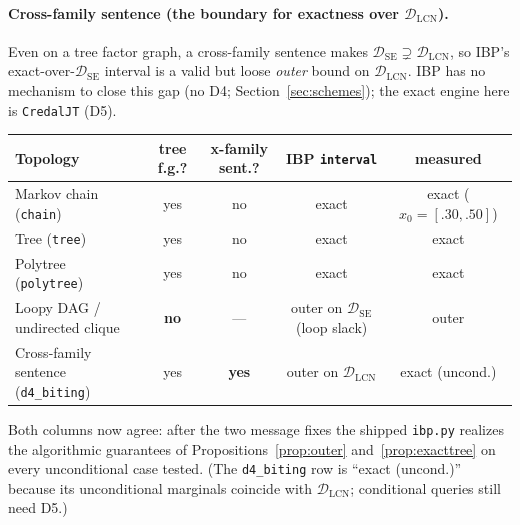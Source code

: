 \documentclass[11pt]{article}
\newcommand{\DSE}{\mathcal{D}_{\mathrm{SE}}}
\newcommand{\DLCN}{\mathcal{D}_{\mathrm{LCN}}}
\begin{document}
\paragraph{Cross-family sentence (the boundary for exactness over $\DLCN$).} Even on a tree factor
graph, a cross-family sentence makes $\DSE\supsetneq\DLCN$, so IBP's exact-over-$\DSE$ interval is a
valid but loose \emph{outer} bound on $\DLCN$. IBP has no mechanism to close this gap (no D4;
Section~\ref{sec:schemes}); the exact engine here is \texttt{CredalJT} (D5).

\begin{center}\small
\begin{tabular}{lcccc}
\toprule
Topology & tree f.g.? & x-family sent.? & IBP \texttt{interval} & measured \\
\midrule
Markov chain (\texttt{chain})     & yes & no  & exact & exact ($x_0{=}[.30,.50]$) \\
Tree (\texttt{tree})              & yes & no  & exact & exact \\
Polytree (\texttt{polytree})      & yes & no  & exact & exact \\
Loopy DAG / undirected clique     & \textbf{no}  & --- & outer on $\DSE$ (loop slack) & outer \\
Cross-family sentence (\texttt{d4\_biting}) & yes & \textbf{yes} & outer on $\DLCN$ & exact (uncond.) \\
\bottomrule
\end{tabular}
\end{center}
\noindent Both columns now agree: after the two message fixes the shipped \texttt{ibp.py} realizes
the algorithmic guarantees of Propositions~\ref{prop:outer} and~\ref{prop:exacttree} on every
unconditional case tested. (The \texttt{d4\_biting} row is ``exact (uncond.)'' because its
unconditional marginals coincide with $\DLCN$; conditional queries still need D5.)
\end{document}
